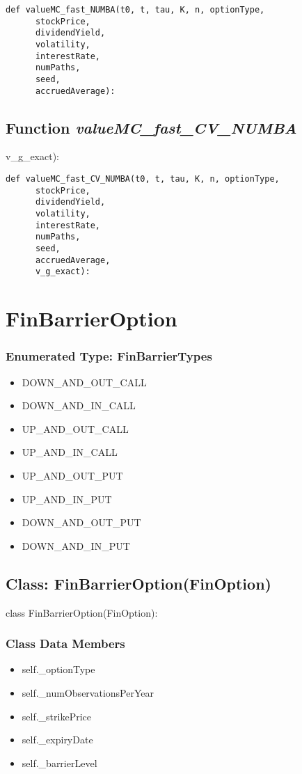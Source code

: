 \documentclass[twoside,11pt]{book}
\begin{document}
\begin{lstlisting}
def valueMC_fast_NUMBA(t0, t, tau, K, n, optionType,
      stockPrice,
      dividendYield,
      volatility,
      interestRate,
      numPaths,
      seed,
      accruedAverage):
\end{lstlisting}

\subsection{Function {\it valueMC\_fast\_CV\_NUMBA}}
v\_g\_exact):

\begin{lstlisting}
def valueMC_fast_CV_NUMBA(t0, t, tau, K, n, optionType,
      stockPrice,
      dividendYield,
      volatility,
      interestRate,
      numPaths,
      seed,
      accruedAverage, 
      v_g_exact):
\end{lstlisting}

\newpage
\section{FinBarrierOption}

\subsubsection{Enumerated Type: FinBarrierTypes}
\begin{itemize}
\item{DOWN\_AND\_OUT\_CALL}
\item{DOWN\_AND\_IN\_CALL}
\item{UP\_AND\_OUT\_CALL}
\item{UP\_AND\_IN\_CALL}
\item{UP\_AND\_OUT\_PUT}
\item{UP\_AND\_IN\_PUT}
\item{DOWN\_AND\_OUT\_PUT}
\item{DOWN\_AND\_IN\_PUT}
\end{itemize}

\subsection{Class: FinBarrierOption(FinOption)}
class FinBarrierOption(FinOption):

\subsubsection{Class Data Members}
\begin{itemize}
\item{self.\_optionType}
\item{self.\_numObservationsPerYear}
\item{self.\_strikePrice}
\item{self.\_expiryDate}
\item{self.\_barrierLevel}
\end{itemize}
\end{document}
